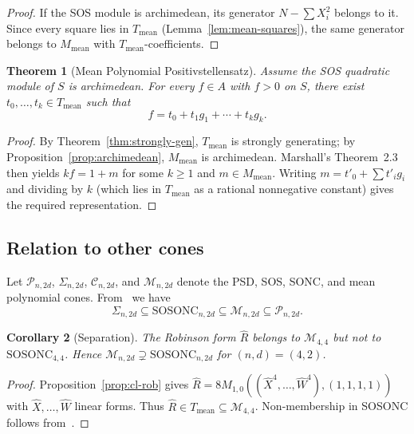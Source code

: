 \documentclass{amsart}
\newtheorem{thm}{Theorem}[section]
\newtheorem{crl}[thm]{Corollary}
\theoremstyle{definition}
\numberwithin{equation}{section}
\begin{document}
\begin{proof}
If the SOS module is archimedean, its generator $N-\sum X_i^2$ belongs to
it.  Since every square lies in $T_{\mathrm{mean}}$
(Lemma~\ref{lem:mean-squares}), the same generator belongs to
$M_{\mathrm{mean}}$ with $T_{\mathrm{mean}}$-coefficients.
\end{proof}

\begin{thm}[Mean Polynomial Positivstellensatz]\label{thm:positiv}
Assume the SOS quadratic module of $S$ is archimedean.  For every $f\in A$
with $f>0$ on $S$, there exist $t_0,\dots,t_k\in T_{\mathrm{mean}}$ such that
\begin{equation}\label{eq:repr}
f=t_0+t_1g_1+\cdots+t_kg_k.
\end{equation}
\end{thm}

\begin{proof}
By Theorem~\ref{thm:strongly-gen}, $T_{\mathrm{mean}}$ is strongly generating;
by Proposition~\ref{prop:archimedean}, $M_{\mathrm{mean}}$ is archimedean.
Marshall's Theorem~2.3~\cite{Marshall02} then yields
$kf=1+m$ for some $k\ge1$ and $m\in M_{\mathrm{mean}}$.  Writing
$m=t'_0+\sum t'_i g_i$ and dividing by $k$ (which lies in $T_{\mathrm{mean}}$
as a rational nonnegative constant) gives the required representation.
\end{proof}

\subsection{Relation to other cones}

Let $\mathcal{P}_{n,2d}$, $\Sigma_{n,2d}$, $\mathcal{C}_{n,2d}$, and
$\mathcal{M}_{n,2d}$ denote the PSD, SOS, SONC, and mean polynomial cones.
From~\cite{DresslerSchick2025,IdW} we have
\[
\Sigma_{n,2d}\subseteq\mathrm{SOSONC}_{n,2d}\subseteq\mathcal{M}_{n,2d}
\subseteq\mathcal{P}_{n,2d}.
\]

\begin{crl}[Separation]\label{crl:separation}
The Robinson form $\hat{R}$ belongs to $\mathcal{M}_{4,4}$ but not to
$\mathrm{SOSONC}_{4,4}$.  Hence
$\mathcal{M}_{n,2d}\supsetneq\mathrm{SOSONC}_{n,2d}$ for $(n,d)=(4,2)$.
\end{crl}

\begin{proof}
Proposition~\ref{prop:cl-rob} gives $\hat{R}=8M_{1,0}((\hat{X}^4,\dots,
\hat{W}^4),(1,1,1,1))$ with $\hat{X},\dots,\hat{W}$ linear forms.
Thus $\hat{R}\in T_{\mathrm{mean}}\subseteq\mathcal{M}_{4,4}$.
Non-membership in SOSONC follows from~\cite[p.~31]{MSc01}.
\end{proof}
\end{document}
